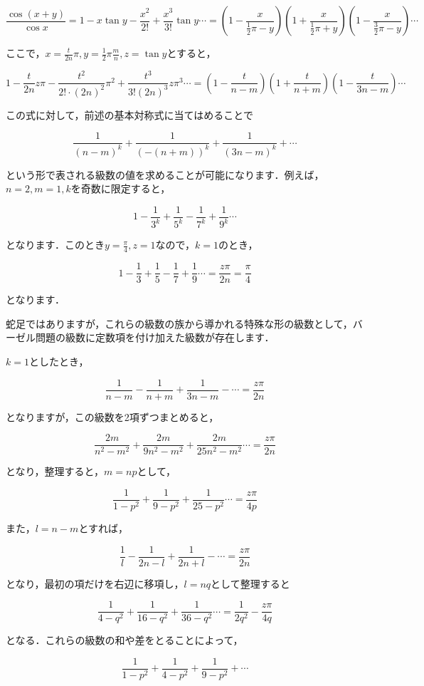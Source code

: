 \documentclass[./main]{subfiles}
\theoremstyle{break}
\begin{document}
\[\frac{\cos (x+y)}{\cos x}=1 -x\tan y- \frac{x^2}{2!}+\frac{x^3}{3!}\tan y\cdots=\left( 1-\frac{x}{\frac{1}{2}\pi -y} \right)\left( 1+\frac{x}{\frac{1}{2}\pi+y} \right)\left( 1-\frac{x}{\frac{3}{2}\pi-y} \right)\cdots\]

ここで，$x=\frac{t}{2n}\pi ,y=\frac{1}{2}\pi \frac{m}{n},z=\tan y$とすると，

\[1 -\frac{t}{2n}z\pi - \frac{t^2}{2!\cdot (2n)^2}\pi^2+\frac{t^3}{3!(2n)^3}z\pi^3\cdots=\left( 1-\frac{t}{n-m} \right)\left( 1+\frac{t}{n+m} \right)\left( 1-\frac{t}{3n-m} \right)\cdots\]

この式に対して，前述の基本対称式に当てはめることで

\[\frac{1}{(n-m)^k}+\frac{1}{(-(n+m))^k}+\frac{1}{(3n-m)^k}+\cdots\]

という形で表される級数の値を求めることが可能になります．例えば，$n=2,m=1,k$を奇数に限定すると，

\[1-\frac{1}{3^k}+\frac{1}{5^k}-\frac{1}{7^k}+\frac{1}{9^k}\cdots\]

となります．このとき$y=\frac{\pi}{4},z=1$なので，$k=1$のとき，

\[1-\frac{1}{3}+\frac{1}{5}-\frac{1}{7}+\frac{1}{9}\cdots=\frac{z\pi}{2n}=\frac{\pi}{4}\]

となります．

蛇足ではありますが，これらの級数の族から導かれる特殊な形の級数として，バーゼル問題の級数に定数項を付け加えた級数が存在します．

$k=1$としたとき，

\[\frac{1}{n-m}-\frac{1}{n+m}+\frac{1}{3n-m}-\cdots=\frac{z\pi}{2n}\]

となりますが，この級数を2項ずつまとめると，

\[\frac{2m}{n^2-m^2}+\frac{2m}{9n^2-m^2}+\frac{2m}{25n^2-m^2}\cdots=\frac{z\pi}{2n}\]

となり，整理すると，$m=np$として，

\[\frac{1}{1-p^2}+\frac{1}{9-p^2}+\frac{1}{25-p^2}\cdots=\frac{z\pi}{4p}\]

また，$l=n-m$とすれば，

\[\frac{1}{l}-\frac{1}{2n-l}+\frac{1}{2n+l}-\cdots=\frac{z\pi}{2n}\]

となり，最初の項だけを右辺に移項し，$l=nq$として整理すると

\[\frac{1}{4-q^2}+\frac{1}{16-q^2}+\frac{1}{36-q^2}\cdots=\frac{1}{2q^2}-\frac{z\pi}{4q}\]

となる．これらの級数の和や差をとることによって，

\[\frac{1}{1-p^2}+\frac{1}{4-p^2}+\frac{1}{9-p^2}+\cdots\]
\end{document}
